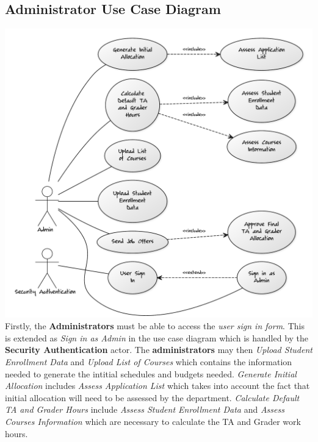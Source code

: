 \documentclass[12pt,openany]{report}
\begin{document}
\subsection{Administrator Use Case Diagram}
\includegraphics[scale=0.45]{model/Diagrams/UC/adminUC}
\\
Firstly, the \textbf{Administrators} must be able to access the \textit{user sign in form}. This is
extended as \textit{Sign in as Admin} in the use case diagram which is handled by the
\textbf{Security Authentication} actor. The \textbf{administrators} may then \textit{Upload Student
Enrollment Data} and \textit{Upload List of Courses} which contains the information needed to
generate the intitial schedules and budgets needed. \textit{Generate Initial Allocation} includes
\textit{Assess Application List} which takes into account the fact that initial allocation will need
to be assessed by the department. \textit{Calculate Default TA and Grader Hours} include
\textit{Assess Student Enrollment Data} and \textit{Assess Courses Information} which are necessary
to calculate the TA and Grader work hours.
\end{document}
